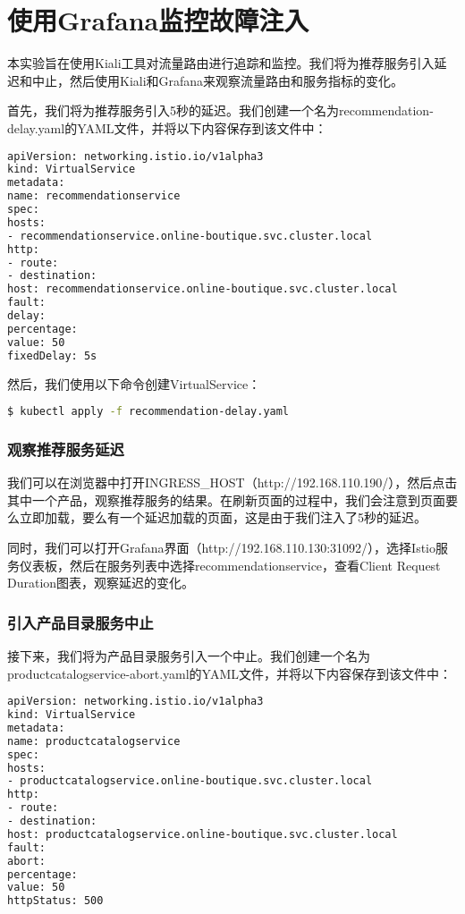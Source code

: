 \chapter{使用Grafana监控故障注入}
本实验旨在使用Kiali工具对流量路由进行追踪和监控。我们将为推荐服务引入延迟和中止，然后使用Kiali和Grafana来观察流量路由和服务指标的变化。

首先，我们将为推荐服务引入5秒的延迟。我们创建一个名为recommendation-delay.yaml的YAML文件，并将以下内容保存到该文件中：

\begin{lstlisting}[language=bash]
apiVersion: networking.istio.io/v1alpha3
kind: VirtualService
metadata:
name: recommendationservice
spec:
hosts:
- recommendationservice.online-boutique.svc.cluster.local
http:
- route:
- destination:
host: recommendationservice.online-boutique.svc.cluster.local
fault:
delay:
percentage:
value: 50
fixedDelay: 5s
\end{lstlisting}

然后，我们使用以下命令创建VirtualService：

\begin{lstlisting}[language=bash]
$ kubectl apply -f recommendation-delay.yaml
\end{lstlisting}

\subsection{观察推荐服务延迟}

我们可以在浏览器中打开INGRESS\_HOST（http://192.168.110.190/），然后点击其中一个产品，观察推荐服务的结果。在刷新页面的过程中，我们会注意到页面要么立即加载，要么有一个延迟加载的页面，这是由于我们注入了5秒的延迟。

同时，我们可以打开Grafana界面（http://192.168.110.130:31092/），选择Istio服务仪表板，然后在服务列表中选择recommendationservice，查看Client Request Duration图表，观察延迟的变化。

\subsection{引入产品目录服务中止}

接下来，我们将为产品目录服务引入一个中止。我们创建一个名为productcatalogservice-abort.yaml的YAML文件，并将以下内容保存到该文件中：

\begin{lstlisting}[language=bash]
apiVersion: networking.istio.io/v1alpha3
kind: VirtualService
metadata:
name: productcatalogservice
spec:
hosts:
- productcatalogservice.online-boutique.svc.cluster.local
http:
- route:
- destination:
host: productcatalogservice.online-boutique.svc.cluster.local
fault:
abort:
percentage:
value: 50
httpStatus: 500
\end{lstlisting}

